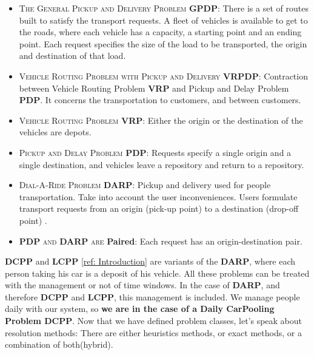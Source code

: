 \documentclass[12pt, a4paper, twoside]{memoir}
\newcommand{\newpar}{\vskip 0.2in \noindent}
\newcommand\tab[1][1cm]{\hspace*{#1}}
\begin{document}
{	\begin{itemize}
		\item \textsc{The General Pickup and Delivery Problem} \textbf{GPDP}: \newline
		\tab There is a set of routes built to satisfy the transport requests. \newline
		\tab A fleet of vehicles is available to get to the roads, where each vehicle has a capacity, a starting point and an ending point. \newline
		\tab Each request specifies the size of the load to be transported, the origin and destination of that load. 
		\item \textsc{Vehicle Routing Problem with Pickup and Delivery} \textbf{VRPDP}: \newline
		\tab Contraction between Vehicle Routing Problem \textbf{VRP} and Pickup and Delay Problem \textbf{PDP}.\newline
		\tab It concerns the transportation to customers, and between customers. 
		\item \textsc{Vehicle Routing Problem} \textbf{VRP}: \newline
		\tab Either the origin or the destination of the vehicles are depots.
		\item \textsc{Pickup and Delay Problem} \textbf{PDP}: \newline
		\tab Requests specify a single origin and a single destination, and vehicles leave a repository and return to a repository. 
		\item \textsc{Dial-A-Ride Problem} \textbf{DARP}: \newline
		\tab Pickup and delivery used for people transportation. \newline
		\tab Take into account the user inconveniences.\newline
		\tab Users formulate transport requests from an origin (pick-up point) to a destination (drop-off point) \cite{yanoptimization2011}. 
		\item \textbf{PDP}\textsc{ and} \textbf{DARP} \textsc{are} \textbf{Paired}: \newline
		\tab Each request has an origin-destination pair.
	\end{itemize}
	\textbf{DCPP} and \textbf{LCPP} \hyperref[sec:The kinds of carpooling]{[ref: Introduction]} are variants of the \textbf{DARP}, where each person taking his car is a deposit of his vehicle.
	\newpar
	All these problems can be treated with the management or not of time windows. In the case of \textbf{DARP}, and therefore \textbf{DCPP} and \textbf{LCPP}, this management is included. \newline
	We manage people daily with our system, so \textbf{we are in the case of a Daily CarPooling Problem DCPP}.
	\newpar
	Now that we have defined problem classes, let's speak about resolution methods: There are either heuristics methods, or exact methods, or a combination of both(hybrid).
	
}
\end{document}
